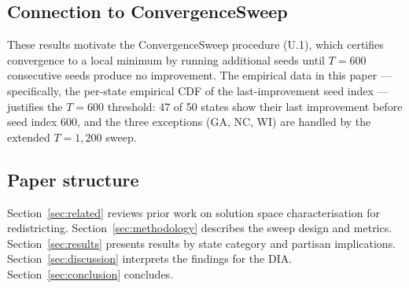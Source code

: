 \subsection*{Connection to ConvergenceSweep}

These results motivate the ConvergenceSweep procedure (U.1), which
certifies convergence to a local minimum by running additional seeds
until $T = 600$ consecutive seeds produce no improvement.
The empirical data in this paper --- specifically, the per-state
empirical CDF of the last-improvement seed index --- justifies the
$T = 600$ threshold: 47 of 50 states show their last improvement
before seed index 600, and the three exceptions (GA, NC, WI) are
handled by the extended $T = 1{,}200$ sweep.

\subsection*{Paper structure}

Section~\ref{sec:related} reviews prior work on solution space
characterisation for redistricting.
Section~\ref{sec:methodology} describes the sweep design and metrics.
Section~\ref{sec:results} presents results by state category and
partisan implications.
Section~\ref{sec:discussion} interprets the findings for the DIA.
Section~\ref{sec:conclusion} concludes.
